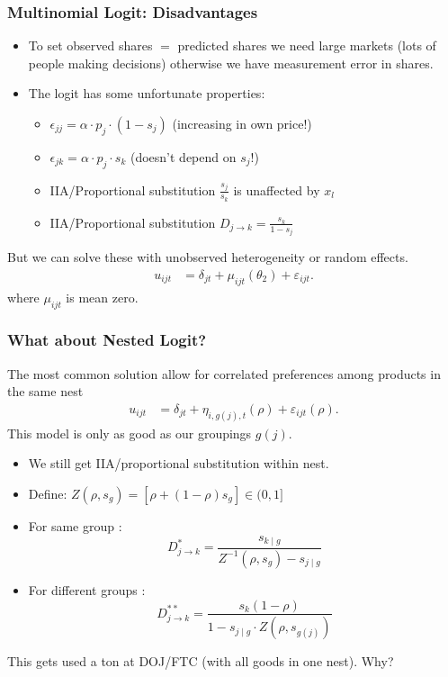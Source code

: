 \documentclass[aspectratio=169,10pt]{beamer}
\begin{document}
\begin{frame}
\frametitle{Multinomial Logit: Disadvantages}
\begin{itemize}
\item To set \alert{observed shares} $=$ \alert{predicted shares} we need \alert{large markets} (lots of people making decisions) otherwise we have \alert{measurement error} in shares.
\item The logit has some unfortunate properties:
\begin{itemize}
    \item $\epsilon_{jj} = \alpha \cdot p_j \cdot (1-s_j)$ (increasing in own price!)
    \item $\epsilon_{jk} = \alpha \cdot p_j \cdot s_k $ (doesn't depend on $s_j$!)
    \item IIA/Proportional substitution $\frac{s_j}{s_k}$ is unaffected by $x_{l}$
    \item IIA/Proportional substitution $D_{j \rightarrow k} = \frac{s_k}{1-s_j}$
\end{itemize}
\end{itemize}
\pause
But we can solve these with \alert{unobserved heterogeneity} or \alert{random effects}.
\begin{align*}
u_{ijt} &= \delta_{jt} +\mu_{ijt}(\theta_2) +  \varepsilon_{ijt}. 
\end{align*}
where $\mu_{ijt}$ is mean zero.
\end{frame}



\begin{frame}
\frametitle{What about Nested Logit?}
The most common solution allow for correlated preferences among products in the same nest
\begin{align*}
u_{ijt} &= \delta_{jt} +\eta_{i,g(j),t}(\rho) +  \varepsilon_{ijt}(\rho). 
\end{align*}
This model is only as good as our groupings $g(j)$.
\begin{itemize}
    \item We still get IIA/proportional substitution \alert{within nest}.
    \item Define: $Z\left(\rho, s_g\right)=\left[\rho+(1-\rho) s_g\right] \in(0,1]$
    \item For same group : $$ D_{j \rightarrow k}^*=\frac{s_{k \mid g}}{Z^{-1}\left(\rho, s_g\right)-s_{j \mid g}} $$
    \item For different groups : $$ D_{j \rightarrow k}^{**}=\frac{s_k(1-\rho)}{1-s_{j \mid g} \cdot Z\left(\rho, s_{g(j)}\right)} $$
\end{itemize}
This gets used a ton at DOJ/FTC (with all goods in one nest). Why?\\
\end{frame}
\end{document}
